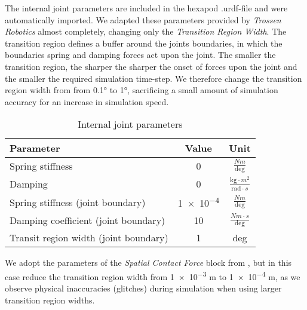 The internal joint parameters are included in the hexapod .urdf-file and were automatically imported.
We adapted these parameters provided by \textit{Trossen Robotics} \parencite{interboticsGithub} almost completely, changing only the \textit{Transition Region Width}.
The transition region defines a buffer around the joints boundaries, in which the boundaries spring and damping forces act upon the joint.
The smaller the transition region, the sharper the sharper the onset of forces upon the joint and the smaller the required simulation time-step.
We  therefore change the transition region width from  from 0.1° to 1°, sacrificing a small amount of simulation accuracy for an increase in simulation speed.

{\def\arraystretch{1.4}\tabcolsep=5pt
	\begin{table}[!h]
		\centering
		\begin{tabular}{| l | c | c |}
			\hline
			\textbf{Parameter} & \textbf{Value} & \textbf{Unit}\\
			\hline
			\hline
			Spring stiffness & 0 & $\frac{Nm}{\text{deg}}$\\
			
			Damping & 0 &  $\frac{\text{kg} \cdot m^2}{\text{rad} \cdot s}$\\
			
			Spring stiffness (joint boundary) & \num{1e-4} & $\frac{Nm}{\text{deg}}$ \\
			
			Damping coefficient (joint boundary) &  10 & $\frac{Nm \cdot s}{\text{deg}}$\\
			
			Transit region width (joint boundary) & 1 &  deg\\
			\hline
		\end{tabular}
		
		\caption{Internal joint parameters}
		\label{table: Joint parameters}
	\end{table}
}

We adopt the parameters of the \textit{Spatial Contact Force} block from \cite{trotta2022walking}, but in this case reduce the transition region width from \num{1e-3} m to \num{1e-4} m, as we observe physical inaccuracies (glitches) during simulation when using larger transition region widths.

